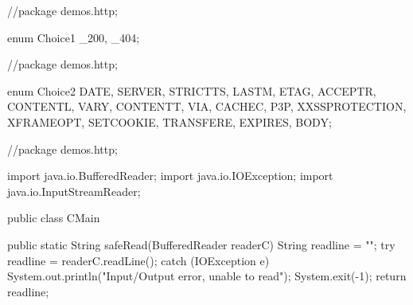 \begin{code}
//package demos.http;

enum Choice1 {
	_200, _404;
}\end{code}

\begin{code}
//package demos.http;

enum Choice2 {
	DATE, SERVER, STRICTTS, LASTM, ETAG, ACCEPTR, CONTENTL, VARY, CONTENTT, VIA, CACHEC, P3P, XXSSPROTECTION, XFRAMEOPT, SETCOOKIE, TRANSFERE, EXPIRES, BODY;
}\end{code}

\begin{code}
//package demos.http;

import java.io.BufferedReader;
import java.io.IOException;
import java.io.InputStreamReader;

public class CMain {
    public static String safeRead(BufferedReader readerC) {
        String readline = "";
        try {
            readline = readerC.readLine();
        } catch (IOException e) {
            System.out.println("Input/Output error, unable to read");
            System.exit(-1);
        }
        return readline;
    }

}
\end{code}
